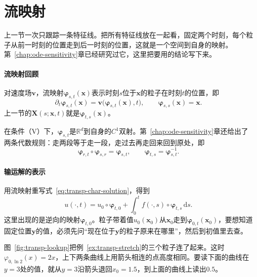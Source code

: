 \section{流映射}
\label{sec:transp-flow}

上一节一次只跟踪一条特征线。把所有特征线放在一起看，固定两个时刻，每个粒子从前一时刻的位置走到后一时刻的位置，这就是一个空间到自身的映射。第~\ref{chap:ode-sensitivity}章已经研究过它，这里把要用的结论写下来。

\paragraph{流映射回顾}
对速度场$\bm{v}$，流映射$\bm{\varphi}_{s,t}(\bm{x})$表示时刻$s$位于$\bm{x}$的粒子在时刻$t$的位置，即
\begin{equation}
  \partial_t\bm{\varphi}_{s,t}(\bm{x})=\bm{v}\bigl(\bm{\varphi}_{s,t}(\bm{x}),t\bigr),\qquad
  \bm{\varphi}_{s,s}(\bm{x})=\bm{x}.
  \label{eq:transp-flow}
\end{equation}
上一节的$\bm{X}(s;\bm{x},t)$就是$\bm{\varphi}_{t,s}(\bm{x})$。

在条件（V）下，$\bm{\varphi}_{s,t}$是$\mathbb{R}^{d}$到自身的$C^{1}$双射。第~\ref{chap:ode-sensitivity}章还给出了两条代数规则：走两段等于走一段，走过去再走回来回到原处，即
\begin{equation}
  \bm{\varphi}_{r,t}\circ\bm{\varphi}_{s,r}=\bm{\varphi}_{s,t},\qquad
  \bm{\varphi}_{t,s}=\bm{\varphi}_{s,t}^{-1}.
  \label{eq:transp-flow-rules}
\end{equation}

\paragraph{输运解的表示}
用流映射重写式~\eqref{eq:transp-char-solution}，得到
\begin{equation}
  u(\cdot,t)=u_0\circ\bm{\varphi}_{t,0}+\int_0^{t}f(\cdot,s)\circ\bm{\varphi}_{t,s}\,\mathrm{d}s.
  \label{eq:transp-flow-solution}
\end{equation}
这里出现的是逆向的映射$\bm{\varphi}_{t,0}$。粒子带着值$u_0(\bm{x}_0)$从$\bm{x}_0$走到$\bm{\varphi}_{0,t}(\bm{x}_0)$，要想知道固定位置$\bm{y}$的值，必须先问“现在位于$\bm{y}$的粒子原来在哪里”，然后到初值里去查。

图~\ref{fig:transp-lookup}把例~\ref{ex:transp-stretch}的三个粒子连了起来。这时$\varphi_{0,\ln2}(x)=2x$，上下两条曲线上用箭头相连的点高度相同。要读下面的曲线在$y=3$处的值，就从$y=3$沿箭头退回$x_0=1.5$，到上面的曲线上读出$0.5$。

